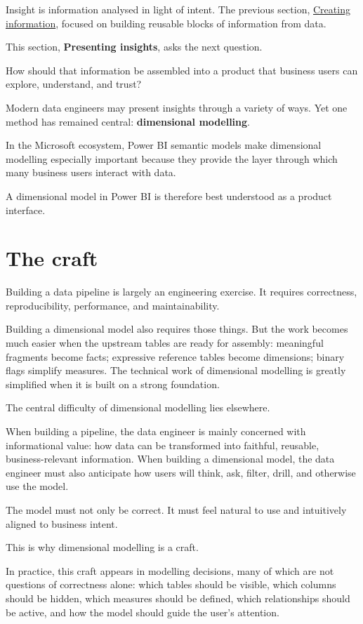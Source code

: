 \documentclass[10pt,openany,10pt]{book}
\begin{document}
Insight is information analysed in light of intent. The previous
section,
\hyperref[docs-creating-information-expressiveness-and-fragment-modelling]{Creating
information}, focused on building reusable blocks of information from
data.

This section, \textbf{Presenting insights}, asks the next question.

How should that information be assembled into a product that business
users can explore, understand, and trust?

Modern data engineers may present insights through a variety of ways.
Yet one method has remained central: \textbf{dimensional modelling}.

In the Microsoft ecosystem, Power BI semantic models make dimensional
modelling especially important because they provide the layer through
which many business users interact with data.

A dimensional model in Power BI is therefore best understood as a
product interface.

\section{The craft}\label{the-craft}

Building a data pipeline is largely an engineering exercise. It requires
correctness, reproducibility, performance, and maintainability.

Building a dimensional model also requires those things. But the work
becomes much easier when the upstream tables are ready for assembly:
meaningful fragments become facts; expressive reference tables become
dimensions; binary flags simplify measures. The technical work of
dimensional modelling is greatly simplified when it is built on a strong
foundation.

The central difficulty of dimensional modelling lies elsewhere.

When building a pipeline, the data engineer is mainly concerned with
informational value: how data can be transformed into faithful,
reusable, business-relevant information. When building a dimensional
model, the data engineer must also anticipate how users will think, ask,
filter, drill, and otherwise use the model.

The model must not only be correct. It must feel natural to use and
intuitively aligned to business intent.

This is why dimensional modelling is a craft.

In practice, this craft appears in modelling decisions, many of which
are not questions of correctness alone: which tables should be visible,
which columns should be hidden, which measures should be defined, which
relationships should be active, and how the model should guide the
user's attention.
\end{document}
